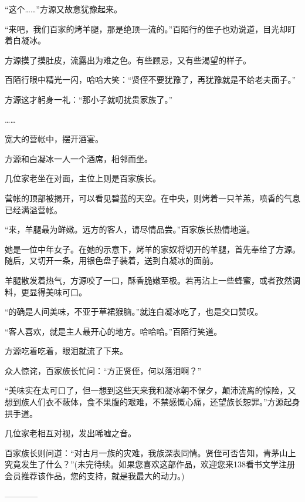 \begin{this_body}
“这个……”方源又故意犹豫起来。

“来吧，我们百家的烤羊腿，那是绝顶一流的。”百陌行的侄子也劝说道，目光却盯着白凝冰。

方源摸了摸肚皮，流露出为难之色。有些顾忌，又有些渴望的样子。

百陌行眼中精光一闪，哈哈大笑：“贤侄不要犹豫了，再犹豫就是不给老夫面子。”

方源这才躬身一礼：“那小子就叨扰贵家族了。”

……

宽大的营帐中，摆开酒宴。

方源和白凝冰一人一个酒席，相邻而坐。

几位家老坐在对面，主位上则是百家族长。

营帐的顶部被揭开，可以看见碧蓝的天空。在中央，则烤着一只羊羔，喷香的气息已经满溢营帐。

“来，羊腿最为鲜嫩。远方的客人，请尽情品尝。”百家族长热情地道。

她是一位中年女子。在她的示意下，烤羊的家奴将切开的羊腿，首先奉给了方源。随后，又切开一条，用银色盘子装着，送到白凝冰的面前。

羊腿散发着热气，方源咬了一口，酥香脆嫩至极。若再沾上一些蜂蜜，或者孜然调料，更显得美味可口。

“的确是人间美味，不亚于草裙猴脑。”就连白凝冰吃了，也是交口赞叹。

“客人喜欢，就是主人最开心的地方。哈哈哈。”百陌行笑道。

方源吃着吃着，眼泪就流了下来。

众人惊诧，百家族长忙问：“方正贤侄，何以落泪啊？”

“美味实在太可口了，但一想到这些天来我和凝冰朝不保夕，颠沛流离的惊险，又想到族人们衣不蔽体，食不果腹的艰难，不禁感慨心痛，还望族长恕罪。”方源起身拱手道。

几位家老相互对视，发出唏嘘之音。

百家族长则问道：“对古月一族的灾难，我族深表同情。贤侄可否告知，青茅山上究竟发生了什么？”(未完待续。如果您喜欢这部作品，欢迎您来138看书文学注册会员推荐该作品，您的支持，就是我最大的动力。)

------------

\end{this_body}

